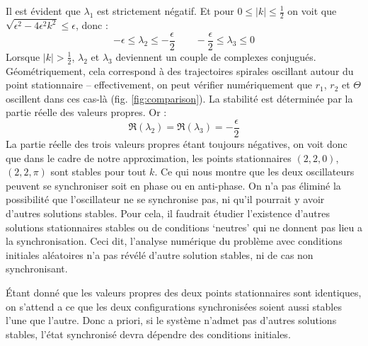 %
Il est évident que $\lambda_1$ est strictement négatif. %
Et pour $0 \leq |k| \leq \frac{1}{2} $ on voit que $\sqrt{\epsilon^2 - 4\epsilon^2k^2} \leq \epsilon$, donc :
\[ -\epsilon \leq \lambda_2 \leq -\frac{\epsilon}{2} \qquad -\frac{\epsilon}{2} \leq \lambda_3 \leq 0\]
%
Lorsque $|k| > \frac{1}{2}$, $\lambda_2$ et $\lambda_3$ deviennent un couple de complexes conjugués. 
Géométriquement, cela correspond à des trajectoires spirales oscillant autour du point stationnaire 
– effectivement, on peut vérifier numériquement que $r_1$, $r_2$ et $\Theta$ oscillent dans ces cas-là (fig. \ref{fig:comparison}). 
La stabilité est déterminée par la partie réelle des valeurs propres. Or :
\[ \Re(\lambda_2) = \Re(\lambda_3) = -\frac{\epsilon}{2} \]
%
La partie réelle des trois valeurs propres étant toujours négatives, 
on voit donc que dans le cadre de notre approximation, les points stationnaires $(2, 2, 0)$, $(2, 2, \pi)$ sont stables pour tout $k$. 
Ce qui nous montre que les deux oscillateurs peuvent se synchroniser soit en phase ou en anti-phase. 
On n'a pas éliminé la possibilité que l'oscillateur ne se synchronise pas, ni qu'il pourrait y avoir d'autres solutions stables. 
Pour cela, il faudrait étudier l’existence d’autres solutions stationnaires stables ou de conditions ‘neutres’ qui ne donnent pas lieu a la synchronisation.
%
Ceci dit, l’analyse numérique du problème 
avec conditions initiales aléatoires n’a pas révélé d’autre solution stables, ni de cas non synchronisant.

Étant donné que les valeurs propres des deux points stationnaires sont identiques, 
on s'attend a ce que les deux configurations synchronisées soient aussi stables l'une que l'autre. 
Donc a priori, si le système n'admet pas d'autres solutions stables, l'état synchronisé devra dépendre des conditions initiales.